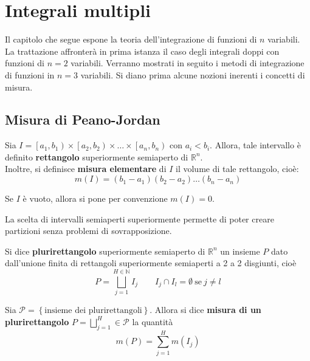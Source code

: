 \chapter{Integrali multipli}
Il capitolo che segue espone la teoria dell'integrazione di funzioni di $n$ variabili. La trattazione affronterà in prima istanza il caso degli integrali doppi con funzioni di $n=2$ variabili. Verranno mostrati in seguito i metodi di integrazione di funzioni in $n=3$ variabili.
Si diano prima alcune nozioni inerenti i concetti di misura.
\section{Misura di Peano-Jordan}
\begin{definition} \label{Def: Rettangolo}
Sia $I=\left[a_1, b_1\right) \times \left[a_2, b_2 \right) \times \dots \times \left[a_n, b_n \right)$ con $a_i < b_i$. Allora, tale intervallo è definito \textbf{rettangolo} superiormente semiaperto di $\mathbb{R}^n$.\\
Inoltre, si definisce \textbf{misura elementare} di $I$ il volume di tale rettangolo, cioè:
\begin{equation}
    m(I)=\left(b_1-a_1\right)\left(b_2-a_2\right)\dots\left(b_n-a_n\right)
\end{equation}
\end{definition}
\begin{oss}
    Se $I$ è vuoto, allora si pone per convenzione $m(I)=0$.
\end{oss}
\begin{oss}
    La scelta di intervalli semiaperti superiormente permette di poter creare partizioni senza problemi di sovrapposizione.
\end{oss}
\begin{definition} \label{Def: Plurirettangolo}
    Si dice \textbf{plurirettangolo} superiormente semiaperto di $\mathbb{R}^n$ un insieme $P$ dato dall'unione finita di rettangoli superiormente semiaperti a 2 a 2 disgiunti, cioè
    \begin{equation}
        P= \bigsqcup_{j=1}^{H \in \mathbb{N}} I_j \qquad I_j \cap I_l = \emptyset\ \text{se}\ j\neq l
    \end{equation}
\end{definition}
\begin{definition} \label{Def: Misura di un plurirettangolo}
Sia $\mathcal{P}= \left\{\text{insieme dei plurirettangoli}\right\}$. Allora si dice \textbf{misura di un plurirettangolo} $P=\bigsqcup\limits_{j=1}^{H} \in \mathcal{P}$ la quantità
\begin{equation}
    m(P)= \sum_{j=1}^{H}{m(I_j)}
\end{equation}
\end{definition}
